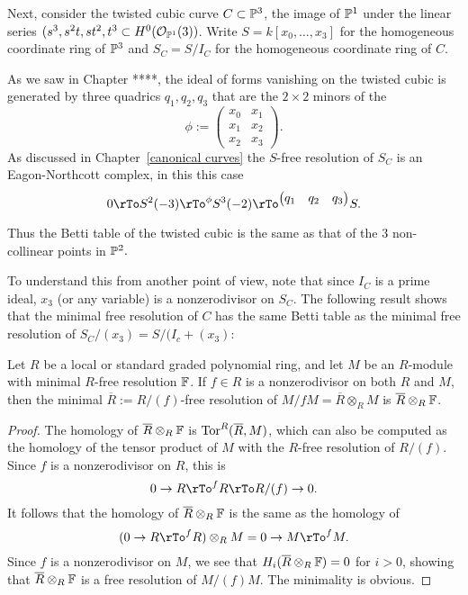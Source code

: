 \begin{example}
 Next, consider the twisted cubic curve $C\subset \PP^{3}$, the image of $\PP^{1}$ under the linear series
 $(s^{3}, s^{2}t, st^{2}, t^{3}\subset H^{0}(\sO_{\PP^{1}}(3))$. Write $S = k[x_{0},\dots,x_{3}]$ for the homogeneous coordinate ring of $\PP^{3}$ and $S_{C} = S/I_{C}$ for the homogeneous coordinate ring of $C$.

As we saw in Chapter ****, the ideal of forms vanishing on the twisted cubic is generated by three quadrics
$q_{1}, q_{2}, q_{3}$ that are the $2\times 2$ minors of the
$$
\phi := \begin{pmatrix}
 x_{0}&x_{1}\\
 x_{1}&x_{2}\\
 x_{2}&x_{3}
\end{pmatrix}.
$$
As discussed in Chapter~\ref{canonical curves} the $S$-free resolution of $S_{C}$ is an Eagon-Northcott complex, in this this case
$$
0 \rTo S^{2}(-3) \rTo^{\phi} S^{3}(-2) \rTo^{
\begin{pmatrix}
q_{1}&q_{2}&q_{3} 
\end{pmatrix}
} S.
$$

Thus the Betti table of the twisted cubic is the same as that of the 3 non-collinear points in $\PP^{2}.$

To understand this from another point of view, note that since $I_{C}$ is a prime ideal, $x_{3}$ (or any variable) is a nonzerodivisor on $S_{C}$. The following result shows that the minimal free resolution of $C$ has the same Betti table as the minimal free resolution of $S_{C}/(x_{3}) = S/(I_{c}+(x_{3})$:

\begin{proposition}\label{reduction modulo a nzd}
Let $R$ be a local or standard graded polynomial ring, and let 
$M$ be an $R$-module with minimal $R$-free resolution $\FF$.
If $f\in R$ is a nonzerodivisor on both $R$ and $M$, then the minimal $\overline R:=R/(f)$-free resolution of
$M/fM = \overline R \otimes_{R}M$ is $\overline R \otimes_{R}\FF$.
\end{proposition}
\begin{proof}
 The homology of $\overline R \otimes_{R}\FF$ is $\Tor^{R}(\overline R,M)$, which can also be computed as the homology of the tensor product of $M$ with the $R$-free resolution of $R/(f)$. Since $f$ is a nonzerodivisor on $R$, this is
$$
0\to R\rTo^{f} R \rTo R/(f) \to 0.
$$
It follows that the homology of $\overline R \otimes_{R}\FF$ is the same as the homology of
$$
(0\to R\rTo^{f} R)\otimes_{R}M  = 0\to M\rTo^{f} M.
$$
Since $f$ is a nonzerodivisor on $M$, we see that $H_{i}( \overline R \otimes_{R}\FF) = 0$ for $i>0$, showing that $\overline R \otimes_{R}\FF$
is a free resolution of $M/(f)M$. The minimality is obvious.
\end{proof}


\end{example}
